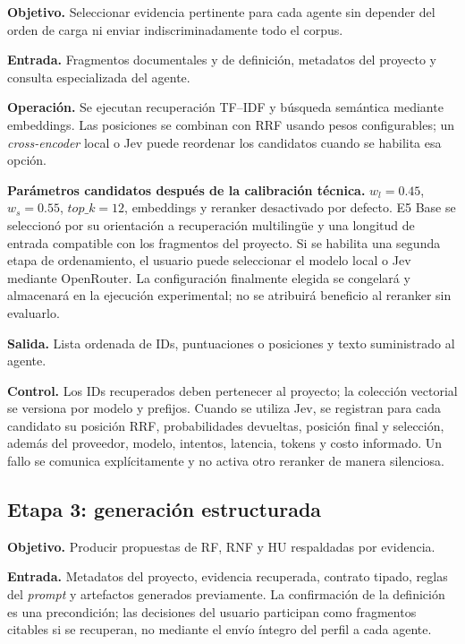 \textbf{Objetivo.} Seleccionar evidencia pertinente para cada agente sin depender del orden de carga ni enviar indiscriminadamente todo el corpus.

\textbf{Entrada.} Fragmentos documentales y de definición, metadatos del proyecto y consulta especializada del agente.

\textbf{Operación.} Se ejecutan recuperación TF--IDF y búsqueda semántica mediante embeddings. Las posiciones se combinan con RRF usando pesos configurables; un \emph{cross-encoder} local o Jev puede reordenar los candidatos cuando se habilita esa opción.

\textbf{Parámetros candidatos después de la calibración técnica.} \(w_l=0.45\), \(w_s=0.55\), \(top\_k=12\), embeddings  y reranker desactivado por defecto. E5 Base se seleccionó por su orientación a recuperación multilingüe y una longitud de entrada compatible con los fragmentos del proyecto. Si se habilita una segunda etapa de ordenamiento, el usuario puede seleccionar el modelo local  o Jev mediante OpenRouter. La configuración finalmente elegida se congelará y almacenará en la ejecución experimental; no se atribuirá beneficio al reranker sin evaluarlo.

\textbf{Salida.} Lista ordenada de IDs, puntuaciones o posiciones y texto suministrado al agente.

\textbf{Control.} Los IDs recuperados deben pertenecer al proyecto; la colección vectorial se versiona por modelo y prefijos. Cuando se utiliza Jev, se registran para cada candidato su posición RRF, probabilidades devueltas, posición final y selección, además del proveedor, modelo, intentos, latencia, tokens y costo informado. Un fallo se comunica explícitamente y no activa otro reranker de manera silenciosa.

\subsection{Etapa 3: generación estructurada}

\textbf{Objetivo.} Producir propuestas de RF, RNF y HU respaldadas por evidencia.

\textbf{Entrada.} Metadatos del proyecto, evidencia recuperada, contrato tipado, reglas del \emph{prompt} y artefactos generados previamente. La confirmación de la definición es una precondición; las decisiones del usuario participan como fragmentos citables si se recuperan, no mediante el envío íntegro del perfil a cada agente.

